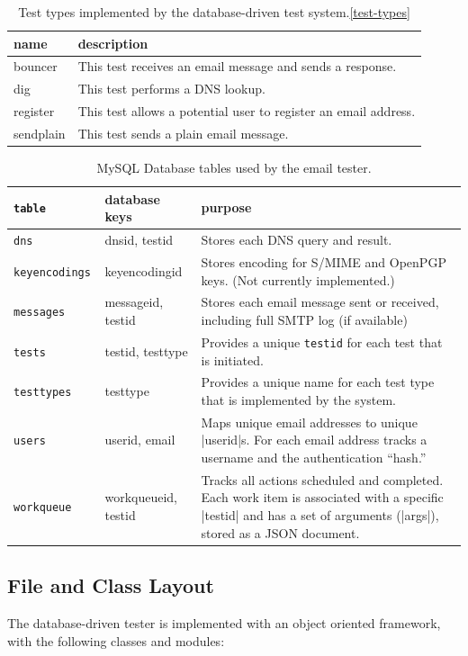 \documentclass[preprint,3p,11pt]{elsarticle}
\begin{document}
\begin{table}
\begin{center}
\begin{tabularx}{\linewidth}{lX}
\hline
name & description \\
\hline
bouncer   & This test receives an email message and sends a response. \\
dig       & This test performs a DNS lookup.\\
register  & This test allows a potential user to register an email address. \\
sendplain & This test sends a plain email message.\\
\hline
\end{tabularx}
\end{center}
\caption{Test types implemented by the database-driven test system.\ref{test-types}}
\end{table}


\begin{table}
\begin{tabular}{|>{\tt}llp{4in}|}
\hline
\textrm{table} & database keys & purpose \\
\hline
dns & dnsid, testid & Stores each DNS query and result. \\
keyencodings & keyencodingid & Stores encoding for S/MIME and OpenPGP keys. (Not currently implemented.) \\
messages & messageid, testid & Stores each email message sent or received, including full SMTP log (if available) \\
tests & testid, testtype & Provides a unique \texttt{testid} for each test that is initiated.\\
testtypes & testtype & Provides a unique name for each test type that is implemented by the system.\\
users & userid, email & Maps unique email addresses to unique |userid|s. For each email address tracks a username and the authentication ``hash.''\\
workqueue & workqueueid, testid & Tracks all actions scheduled and completed. Each work item is associated with a specific |testid| and has a set of arguments (|args|), stored as a JSON document.\\
\hline
\end{tabular}
\caption{MySQL Database tables used by the email tester.}\label{db}
\end{table}

\subsection{File and Class Layout}
The database-driven tester is implemented with an object oriented
framework, with the following classes and modules:
\end{document}

